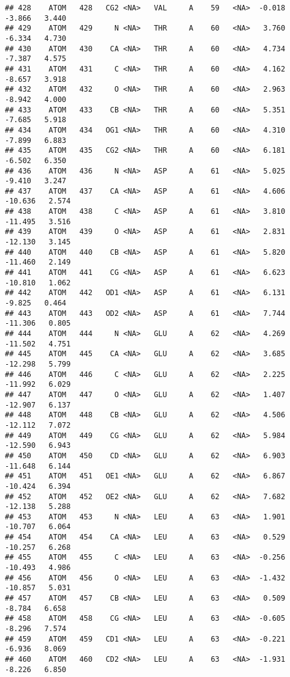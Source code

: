 \documentclass[
]{article}
\begin{document}
\begin{verbatim}
## 428    ATOM   428   CG2 <NA>   VAL     A    59   <NA>  -0.018  -3.866   3.440
## 429    ATOM   429     N <NA>   THR     A    60   <NA>   3.760  -6.334   4.730
## 430    ATOM   430    CA <NA>   THR     A    60   <NA>   4.734  -7.387   4.575
## 431    ATOM   431     C <NA>   THR     A    60   <NA>   4.162  -8.657   3.918
## 432    ATOM   432     O <NA>   THR     A    60   <NA>   2.963  -8.942   4.000
## 433    ATOM   433    CB <NA>   THR     A    60   <NA>   5.351  -7.685   5.918
## 434    ATOM   434   OG1 <NA>   THR     A    60   <NA>   4.310  -7.899   6.883
## 435    ATOM   435   CG2 <NA>   THR     A    60   <NA>   6.181  -6.502   6.350
## 436    ATOM   436     N <NA>   ASP     A    61   <NA>   5.025  -9.410   3.247
## 437    ATOM   437    CA <NA>   ASP     A    61   <NA>   4.606 -10.636   2.574
## 438    ATOM   438     C <NA>   ASP     A    61   <NA>   3.810 -11.495   3.516
## 439    ATOM   439     O <NA>   ASP     A    61   <NA>   2.831 -12.130   3.145
## 440    ATOM   440    CB <NA>   ASP     A    61   <NA>   5.820 -11.460   2.149
## 441    ATOM   441    CG <NA>   ASP     A    61   <NA>   6.623 -10.810   1.062
## 442    ATOM   442   OD1 <NA>   ASP     A    61   <NA>   6.131  -9.825   0.464
## 443    ATOM   443   OD2 <NA>   ASP     A    61   <NA>   7.744 -11.306   0.805
## 444    ATOM   444     N <NA>   GLU     A    62   <NA>   4.269 -11.502   4.751
## 445    ATOM   445    CA <NA>   GLU     A    62   <NA>   3.685 -12.298   5.799
## 446    ATOM   446     C <NA>   GLU     A    62   <NA>   2.225 -11.992   6.029
## 447    ATOM   447     O <NA>   GLU     A    62   <NA>   1.407 -12.907   6.137
## 448    ATOM   448    CB <NA>   GLU     A    62   <NA>   4.506 -12.112   7.072
## 449    ATOM   449    CG <NA>   GLU     A    62   <NA>   5.984 -12.590   6.943
## 450    ATOM   450    CD <NA>   GLU     A    62   <NA>   6.903 -11.648   6.144
## 451    ATOM   451   OE1 <NA>   GLU     A    62   <NA>   6.867 -10.424   6.394
## 452    ATOM   452   OE2 <NA>   GLU     A    62   <NA>   7.682 -12.138   5.288
## 453    ATOM   453     N <NA>   LEU     A    63   <NA>   1.901 -10.707   6.064
## 454    ATOM   454    CA <NA>   LEU     A    63   <NA>   0.529 -10.257   6.268
## 455    ATOM   455     C <NA>   LEU     A    63   <NA>  -0.256 -10.493   4.986
## 456    ATOM   456     O <NA>   LEU     A    63   <NA>  -1.432 -10.857   5.031
## 457    ATOM   457    CB <NA>   LEU     A    63   <NA>   0.509  -8.784   6.658
## 458    ATOM   458    CG <NA>   LEU     A    63   <NA>  -0.605  -8.296   7.574
## 459    ATOM   459   CD1 <NA>   LEU     A    63   <NA>  -0.221  -6.936   8.069
## 460    ATOM   460   CD2 <NA>   LEU     A    63   <NA>  -1.931  -8.226   6.850

\end{verbatim}
\end{document}

